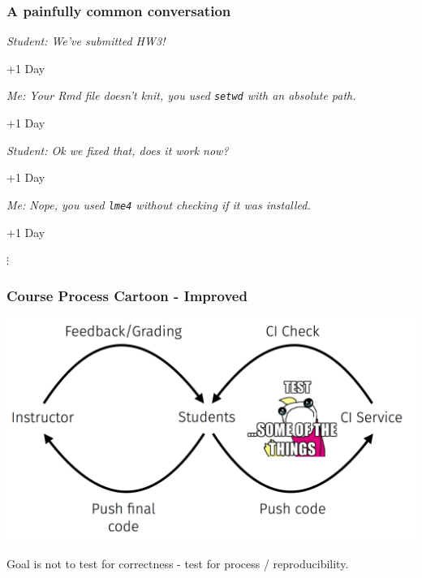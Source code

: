 \documentclass[12pt]{beamer}
\begin{document}

\begin{frame}[fragile]
\frametitle{A painfully common conversation}

{\footnotesize
\textit{Student: We've submitted HW3!}
%
\begin{center} +1 Day \end{center}
%
\textit{Me: Your Rmd file doesn't knit, you used \texttt{setwd} with an absolute path.}
%
\begin{center} +1 Day \end{center}
%
\textit{Student: Ok we fixed that, does it work now?}
%
\begin{center} +1 Day \end{center}
%
\textit{Me: Nope, you used \texttt{lme4} without checking if it was installed.}
%
\begin{center} +1 Day \end{center}
%
\begin{center} $\vdots$ \end{center}
}
\end{frame}


\begin{frame}
\frametitle{Course Process Cartoon - Improved}

\begin{center}
\includegraphics[width=\textwidth]{imgs/cycle_ci_meme.png}
\end{center}

Goal is not to test for correctness - test for process / reproducibility.

\end{frame}
\end{document}
